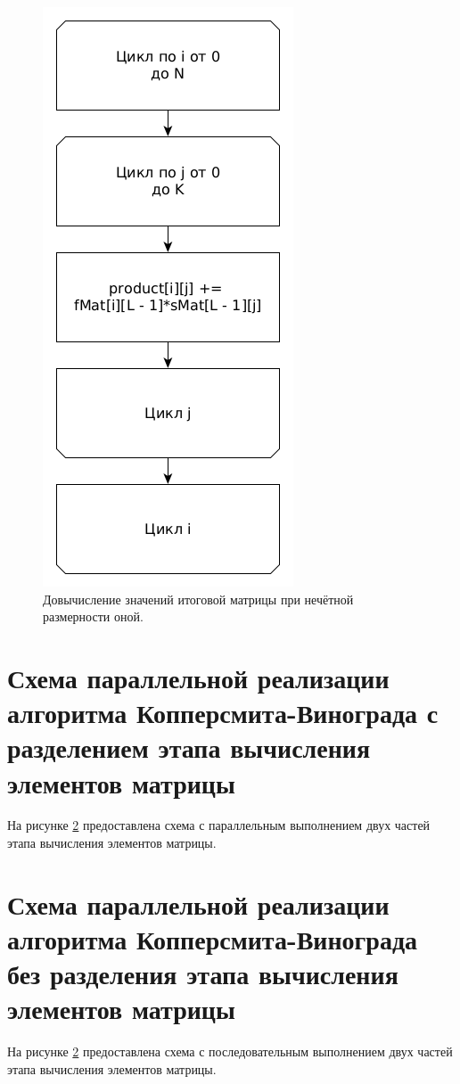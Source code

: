 \documentclass[12pt]{report}
\begin{document}
\begin{figure}
\begin{center}
\includegraphics[scale=0.4]{inc/img/paralPart3.png}
\captionsetup{justification=centering}
	\caption{Довычисление значений итоговой матрицы при нечётной размерности оной.}
	\label{img:paralPart3}	
\end{center}
\end{figure}
\newpage

\section{Схема параллельной реализации алгоритма Копперсмита-Винограда с разделением этапа вычисления элементов матрицы}
На рисунке \ref{} предоставлена схема с параллельным выполнением двух частей этапа вычисления элементов матрицы.

\section{Схема параллельной реализации алгоритма Копперсмита-Винограда без разделения этапа вычисления элементов матрицы}
На рисунке \ref{} предоставлена схема с последовательным выполнением двух частей этапа вычисления элементов матрицы.
\end{document}
